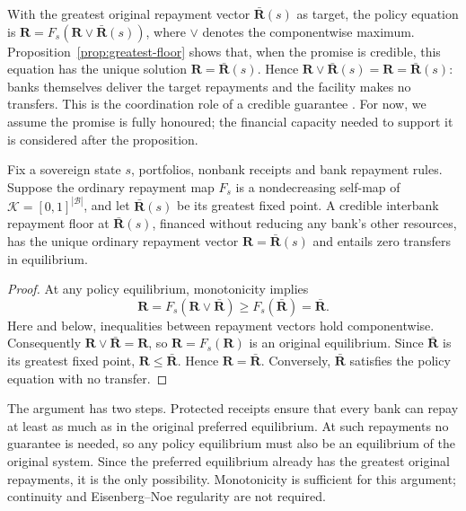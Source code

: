 With the greatest original repayment vector $\bar{\mathbf{R}}(s)$ as target, the policy equation is $\mathbf{R}=F_s(\mathbf{R}\vee\bar{\mathbf{R}}(s))$, where $\vee$ denotes the componentwise maximum. Proposition~\ref{prop:greatest-floor} shows that, when the promise is credible, this equation has the unique solution $\mathbf{R}=\bar{\mathbf{R}}(s)$. Hence $\mathbf{R}\vee\bar{\mathbf{R}}(s)=\mathbf{R}=\bar{\mathbf{R}}(s)$: banks themselves deliver the target repayments and the facility makes no transfers. This is the coordination role of a credible guarantee \citep{DiamondDybvig1983,JacksonPernoud2021}. For now, we assume the promise is fully honoured; the financial capacity needed to support it is considered after the proposition.

\begin{proposition}\label{prop:greatest-floor}
Fix a sovereign state $s$, portfolios, nonbank receipts and bank repayment rules. Suppose the ordinary repayment map $F_s$ is a nondecreasing self-map of $\mathcal K=[0,1]^{|\mathcal B|}$, and let $\bar{\mathbf{R}}(s)$ be its greatest fixed point. A credible interbank repayment floor at $\bar{\mathbf{R}}(s)$, financed without reducing any bank's other resources, has the unique ordinary repayment vector $\mathbf{R}=\bar{\mathbf{R}}(s)$ and entails zero transfers in equilibrium.
\end{proposition}
\begin{proof}
At any policy equilibrium, monotonicity implies
\[
 \mathbf{R}=F_s(\mathbf{R}\vee\bar{\mathbf{R}})\geq F_s(\bar{\mathbf{R}})=\bar{\mathbf{R}}.
\]
Here and below, inequalities between repayment vectors hold componentwise. Consequently $\mathbf{R}\vee\bar{\mathbf{R}}=\mathbf{R}$, so $\mathbf{R}=F_s(\mathbf{R})$ is an original equilibrium. Since $\bar{\mathbf{R}}$ is its greatest fixed point, $\mathbf{R}\leq\bar{\mathbf{R}}$. Hence $\mathbf{R}=\bar{\mathbf{R}}$. Conversely, $\bar{\mathbf{R}}$ satisfies the policy equation with no transfer.
\end{proof}

The argument has two steps. Protected receipts ensure that every bank can repay at least as much as in the original preferred equilibrium. At such repayments no guarantee is needed, so any policy equilibrium must also be an equilibrium of the original system. Since the preferred equilibrium already has the greatest original repayments, it is the only possibility. Monotonicity is sufficient for this argument; continuity and Eisenberg--Noe regularity are not required.

